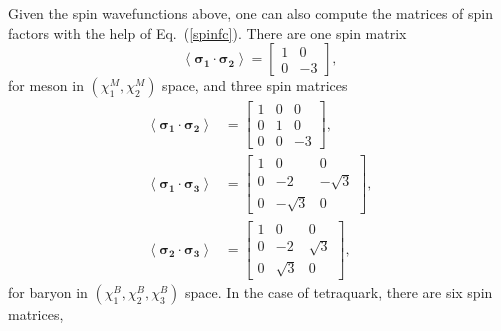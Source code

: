 \documentclass[prd,twocolumn,floatfix,nofootinbib]{revtex4}
\begin{document}
Given the spin wavefunctions above, one can also compute the matrices of
spin factors with the help of Eq.~(\ref{spinfc}). There are one spin matrix
\begin{equation}
\left\langle \boldsymbol{\sigma _{1}}\cdot \boldsymbol{\sigma _{2}}%
\right\rangle =%
\begin{bmatrix}
1 & 0 \\
0 & -3%
\end{bmatrix}%
,  \label{sfcM}
\end{equation}%
for meson in $(\chi _{1}^{M},\chi _{2}^{M})$ space, and three spin matrices
\begin{align}
\left\langle \boldsymbol{\sigma _{1}}\cdot \boldsymbol{\sigma _{2}}%
\right\rangle & =%
\begin{bmatrix}
1 & 0 & 0 \\
0 & 1 & 0 \\
0 & 0 & -3%
\end{bmatrix}%
, \\
\left\langle \boldsymbol{\sigma _{1}}\cdot \boldsymbol{\sigma _{3}}%
\right\rangle & =%
\begin{bmatrix}
1 & 0 & 0 \\
0 & -2 & -\sqrt{3} \\
0 & -\sqrt{3} & 0%
\end{bmatrix}%
, \\
\left\langle \boldsymbol{\sigma _{2}}\cdot \boldsymbol{\sigma _{3}}%
\right\rangle & =%
\begin{bmatrix}
1 & 0 & 0 \\
0 & -2 & \sqrt{3} \\
0 & \sqrt{3} & 0%
\end{bmatrix}%
,
\end{align}%
for baryon in $(\chi _{1}^{B},\chi _{2}^{B},\chi _{3}^{B})$ space. In the
case of tetraquark, there are six spin matrices,
\end{document}
